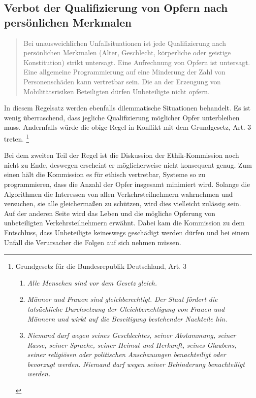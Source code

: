 \documentclass[twoside,a4paper,12pt]{article}
\begin{document}
\subsection{Verbot der Qualifizierung von Opfern nach persönlichen Merkmalen} \label{VerbotDerQualifizierungMoeglicherOpferNachPersönlichenMerkmalen}
\begin{quote}
\glqq
Bei unausweichlichen Unfallsituationen ist jede Qualifizierung nach persönlichen Merkmalen (Alter, Geschlecht, 
körperliche oder geistige Konstitution) strikt untersagt. Eine
Aufrechnung von Opfern ist untersagt. Eine allgemeine Programmierung auf eine Minderung der Zahl von Personenschäden 
kann vertretbar sein. Die an der Erzeugung von
Mobilitätsrisiken Beteiligten dürfen Unbeteiligte nicht opfern.\grqq\mbox{~\cite[S. 11]{ek}}
\end{quote}

In diesem Regelsatz werden ebenfalls dilemmatische Situationen behandelt. Es ist wenig überraschend, dass jegliche Qualifizierung möglicher Opfer unterbleiben muss. Andernfalls würde die obige Regel in Konflikt mit dem Grundgesetz, Art. 3 treten.
\footnote{Grundgesetz für die Bundesrepublik Deutschland, Art. 3
\begin{enumerate} 
\item \textit{Alle Menschen sind vor dem Gesetz gleich.}
\item \textit{Männer und Frauen sind gleichberechtigt. Der Staat fördert die tatsächliche Durchsetzung der Gleichberechtigung von Frauen und Männern und wirkt auf die Beseitigung bestehender Nachteile hin.}
\item\textit{ Niemand darf wegen seines Geschlechtes, seiner Abstammung, seiner Rasse, seiner Sprache, seiner Heimat und Herkunft, seines Glaubens, seiner religiösen oder politischen Anschauungen benachteiligt oder bevorzugt werden. Niemand darf wegen seiner Behinderung benachteiligt werden.}
\end{enumerate}}

Bei dem zweiten Teil der Regel ist die Diskussion der Ethik-Kommission noch nicht zu Ende, deswegen erscheint er möglicherweise nicht konsequent genug. 
Zum einen hält die Kommission es für ethisch vertretbar, Systeme so zu programmieren, dass die Anzahl der Opfer insgesamt minimiert wird. Solange die Algorithmen die Interessen von allen Verkehrsteilnehmern wahrnehmen und versuchen, sie alle gleichermaßen zu schützen, wird dies vielleicht zulässig sein. Auf der anderen Seite wird das Leben und die mögliche Opferung von unbeteiligten Verkehrsteilnehmern erwähnt. Dabei kam die Kommission zu dem Entschluss, dass Unbeteiligte keineswegs geschädigt werden dürfen und bei einem Unfall die Verursacher die Folgen auf sich nehmen müssen.\\
\end{document}

